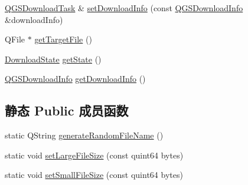 \begin{DoxyCompactItemize}
\item 
\mbox{\hyperlink{class_q_g_s_download_task}{Q\+G\+S\+Download\+Task}} \& \mbox{\hyperlink{class_q_g_s_download_task_a0d53b40daf5e4074629d9ce552f4f579}{set\+Download\+Info}} (const \mbox{\hyperlink{class_q_g_s_download_info}{Q\+G\+S\+Download\+Info}} \&download\+Info)
\item 
Q\+File $\ast$ \mbox{\hyperlink{class_q_g_s_download_task_a766b7bcd0bc8a38364556720089e17fd}{get\+Target\+File}} ()
\item 
\mbox{\hyperlink{_q_g_s_download_task_8h_a94e6cd327cf2fc9490b4c797c7023a6e}{Download\+State}} \mbox{\hyperlink{class_q_g_s_download_task_a89a8047ceebee36c4d2c6672a2056dc0}{get\+State}} ()
\item 
\mbox{\hyperlink{class_q_g_s_download_info}{Q\+G\+S\+Download\+Info}} \mbox{\hyperlink{class_q_g_s_download_task_a652a6110f105aa9da63e26f5f6a46ae8}{get\+Download\+Info}} ()
\end{DoxyCompactItemize}
\subsection*{静态 Public 成员函数}
\begin{DoxyCompactItemize}
\item 
static Q\+String \mbox{\hyperlink{class_q_g_s_download_task_a51ccfbec29dc3ad74e6ef48f6e172487}{generate\+Random\+File\+Name}} ()
\item 
static void \mbox{\hyperlink{class_q_g_s_download_task_a45bf37a628a15795549b31a3f3555d57}{set\+Large\+File\+Size}} (const quint64 bytes)
\item 
static void \mbox{\hyperlink{class_q_g_s_download_task_a13e78fae63ded7388b79a7ddd69ec416}{set\+Small\+File\+Size}} (const quint64 bytes)
\end{DoxyCompactItemize}
